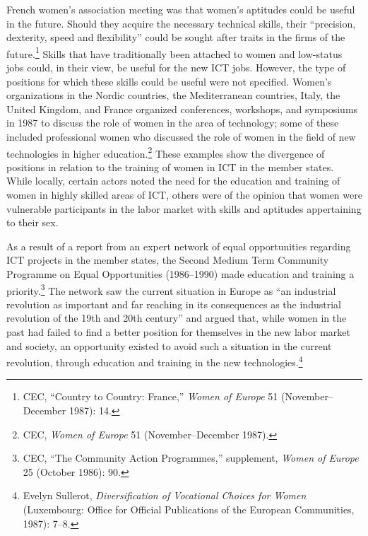 \documentclass{tufte-handout}
\begin{document}
French women's association meeting was that women's aptitudes could be
useful in the future. Should they acquire the necessary technical
skills, their ``precision, dexterity, speed and flexibility'' could be
sought after traits in the firms of the future.\footnote{CEC, ``Country
  to Country: France,'' \emph{Women of Europe} 51 (November--December
  1987): 14.} Skills that have traditionally been attached to women and
low-status jobs could, in their view, be useful for the new ICT jobs.
However, the type of positions for which these skills could be useful
were not specified. Women's organizations in the Nordic countries, the
Mediterranean countries, Italy, the United Kingdom, and France organized
conferences, workshops, and symposiums in 1987 to discuss the role of
women in the area of technology; some of these included professional
women who discussed the role of women in the field of new technologies
in higher education.\footnote{CEC, \emph{Women of Europe} 51
  (November--December 1987).} These examples show the divergence of
positions in relation to the training of women in ICT in the member
states. While locally, certain actors noted the need for the education
and training of women in highly skilled areas of ICT, others were of the
opinion that women were vulnerable participants in the labor market with
skills and aptitudes appertaining to their sex.

As a result of a report from an expert network of equal opportunities
regarding ICT projects in the member states, the Second Medium Term
Community Programme on Equal Opportunities (1986--1990) made education
and training a priority.\footnote{CEC, ``The Community Action
  Programmes,'' supplement, \emph{Women of Europe} 25 (October 1986):
  90.} The network saw the current situation in Europe as ``an
industrial revolution as important and far reaching in its consequences
as the industrial revolution of the 19th and 20th century'' and argued
that, while women in the past had failed to find a better position for
themselves in the new labor market and society, an opportunity existed
to avoid such a situation in the current revolution, through education
and training in the new technologies.\footnote{Evelyn Sullerot,
  \emph{Diversification of Vocational Choices for Women} (Luxembourg:
  Office for Official Publications of the European Communities, 1987):
  7--8.}
\end{document}
